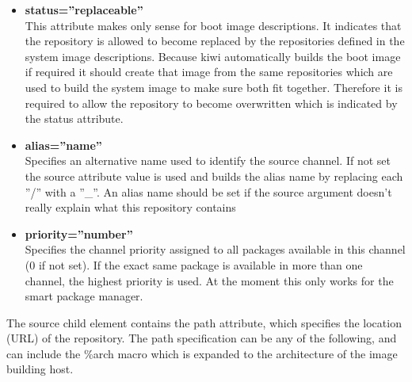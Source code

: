 \begin{itemize}
\item \textbf{status=''replaceable''}\\
      This attribute makes only sense for boot image descriptions.
      It indicates that the repository is allowed to become replaced by
      the repositories defined in the system image descriptions. Because kiwi
      automatically builds the boot image if required it should create that
      image from the same repositories which are used to build the system
      image to make sure both fit together. Therefore it is required to allow
      the repository to become overwritten which is indicated by the status
      attribute.
\item \textbf{alias=''name''}\\
      Specifies an alternative name used to identify the source channel.
      If not set the source attribute value is used and builds the alias name
      by replacing each ''/'' with a ''\_''. An alias name should be set if
      the source argument doesn't really explain what this repository
      contains 
\item \textbf{priority=''number''}\\
      Specifies the channel priority assigned to all packages available in
      this channel (0 if not set). If the exact same package
      is available in more than one channel, the highest priority is used.
      At the moment this only works for the smart package manager.
\end{itemize}

The source child element contains the path attribute, which specifies
the location (URL) of the repository. The path specification can be any
of the following, and can include the \%arch macro which is expanded
to the architecture of the image building host.

